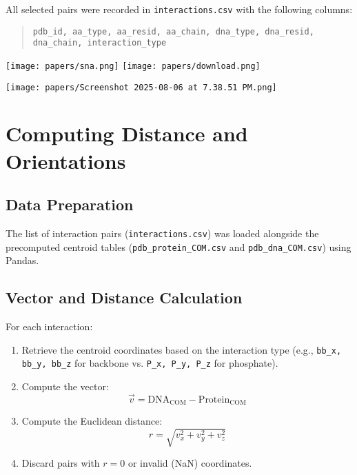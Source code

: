\documentclass[12pt,a4paper]{report}
\begin{document}
All selected pairs were recorded in \texttt{interactions.csv} with the following columns:
\begin{quote}
\texttt{pdb\_id, aa\_type, aa\_resid, aa\_chain, dna\_type, dna\_resid, dna\_chain, interaction\_type}
\end{quote}
\vspace{1 cm}

\texttt{[image: papers/sna.png]} \hspace{1 cm}
\texttt{[image: papers/download.png]}

\vspace{2 cm}

\texttt{[image: papers/Screenshot 2025-08-06 at 7.38.51 PM.png]}

\newpage
\section*{Computing Distance and Orientations}
\subsection*{Data Preparation}
The list of interaction pairs (\texttt{interactions.csv}) was loaded alongside the precomputed centroid tables (\texttt{pdb\_protein\_COM.csv} and \texttt{pdb\_dna\_COM.csv}) using Pandas.

\subsection*{Vector and Distance Calculation}
For each interaction:
\begin{enumerate}
    \item Retrieve the centroid coordinates based on the interaction type (e.g., \texttt{bb\_x, bb\_y, bb\_z} for backbone vs. \texttt{P\_x, P\_y, P\_z} for phosphate).
    \item Compute the vector:
    \[
    \vec{v} = \text{DNA}_{\text{COM}} - \text{Protein}_{\text{COM}}
    \]
    \item Compute the Euclidean distance:
    \[
    r = \sqrt{v_x^2 + v_y^2 + v_z^2}
    \]
    \item Discard pairs with $r = 0$ or invalid (NaN) coordinates.
\end{enumerate}
\end{document}
